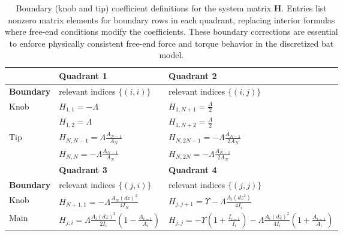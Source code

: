 \documentclass[linenumbers]{aastex7}
\begin{document}
\begin{table}[h!]
    \centering
    {\renewcommand{\arraystretch}{1.6}
    \begin{tabular}{|p{}|p{}|p{}|}
        \hline
        &\textbf{Quadrant 1} & \textbf{Quadrant 2} \\ 
        \hline
        \textbf{Boundary}&  relevant indices $\{(i, i)\}$ & relevant indices $\{(i, j)\}$\\

        \hline \hline
        Knob
        & $\displaystyle H_{1,1} = -\Lambda$
        & $\displaystyle H_{1, N+1} = \frac{\Lambda}{2}$
        \\
        & $\displaystyle H_{1, 2} = \Lambda$
        & $\displaystyle H_{1, N+2} = \frac{\Lambda}{2}$
        \\

        Tip
        & $\displaystyle H_{N,N-1} = \Lambda \frac{A_{N-1}}{A_N}$
        & $\displaystyle H_{N, 2N-1} = -\Lambda \frac{A_{N-1}}{2A_N}$
        \\

        & $\displaystyle H_{N,N} = -\Lambda \frac{A_{N-1}}{A_N}$
        & $\displaystyle H_{N, 2N} = -\Lambda \frac{A_{N-1}}{2A_N}$
        \\
        

        \hline 
        \hline
        & \textbf{Quadrant 3} & \textbf{Quadrant 4} \\ 
        \hline
        \textbf{Boundary}& relevant indices $\{(j, i)\}$ & relevant indices $\{(j, j)\}$\\

        \hline \hline
        Knob
        & $\displaystyle H_{N+1, 1} = -\Lambda \frac{A_N(dz)^2}{4I_N}$
        & $\displaystyle H_{j, j+1} = \Upsilon - \Lambda \frac{A_i (dz^2)}{4I_i}$
        \\
        Main 
        & $\displaystyle H_{j,i} = \Lambda \frac{A_i (dz)^2}{2I_i}\left(1 - \frac{A_{i-1}}{A_i}\right)$
        & $\displaystyle H_{j, j} = -\Upsilon\left(1 + \frac{I_{i-1}}{I_i}\right) - \Lambda\frac{A_i (dz)^2}{4I_i}\left(1+\frac{A_{i-1}}{A_i}\right) $
        \\
        \hline
    \end{tabular}
    }
    \caption{Boundary (knob and tip) coefficient definitions for the system matrix $\mathbf{H}$. Entries list nonzero matrix elements for boundary rows in each quadrant, replacing interior formulas where free-end conditions modify the coefficients. These boundary corrections are essential to enforce physically consistent free-end force and torque behavior in the discretized bat model.}
    \label{tab:Hboundary}
\end{table}
\end{document}
